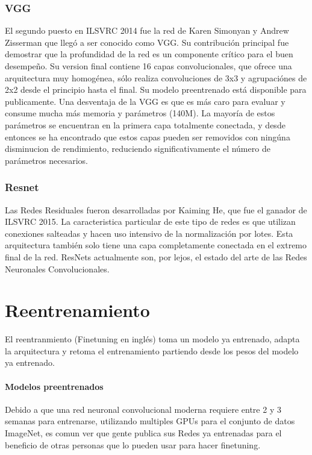 \documentclass[a4paper,11pt,spanish]{book}
\begin{document}
      \subsubsection{VGG}
	El segundo puesto en ILSVRC 2014 fue la red de Karen Simonyan y Andrew Zisserman que llegó a ser conocido como VGG. Su contribución principal fue demostrar que la profundidad de
	la red es un componente crítico para el buen desempeño. Su version final contiene 16 capas convolucionales, que ofrece una arquitectura muy homogénea, sólo
	realiza convoluciones de 3x3 y agrupaciónes de 2x2 desde el principio hasta el final. Su modelo preentrenado está disponible para publicamente.
	Una desventaja de la VGG es que es más caro para evaluar y consume mucha más memoria y parámetros (140M). La mayoría de estos parámetros se encuentran en la primera
	capa totalmente conectada, y desde entonces se ha encontrado que estos capas pueden ser removidos con ningúna disminucion de rendimiento, reduciendo significativamente el
	número de parámetros necesarios.

      \subsubsection{Resnet}
	Las Redes Residuales fueron desarrolladas por Kaiming He, que fue el ganador de ILSVRC 2015. La caracteristica particular de este tipo de redes es que  utilizan conexiones salteadas
	y hacen uso intensivo de la normalización por lotes.
	Esta arquitectura también solo tiene una capa completamente conectada en el extremo final de la red. ResNets actualmente son, por lejos, el estado del arte de las
	Redes Neuronales Convolucionales.

    \section {Reentrenamiento}
      El reentranmiento (Finetuning en inglés) toma un modelo ya entrenado, adapta la arquitectura y retoma el entrenamiento partiendo desde los pesos del modelo ya entrenado.

      \paragraph{Modelos preentrenados}
	Debido a que una red neuronal convolucional moderna requiere entre 2 y 3 semanas para entrenarse, utilizando multiples GPUs para el conjunto de datos ImageNet, es comun ver que gente
	publica sus Redes ya entrenadas para el beneficio de otras personas que lo pueden usar para hacer finetuning.
\end{document}
